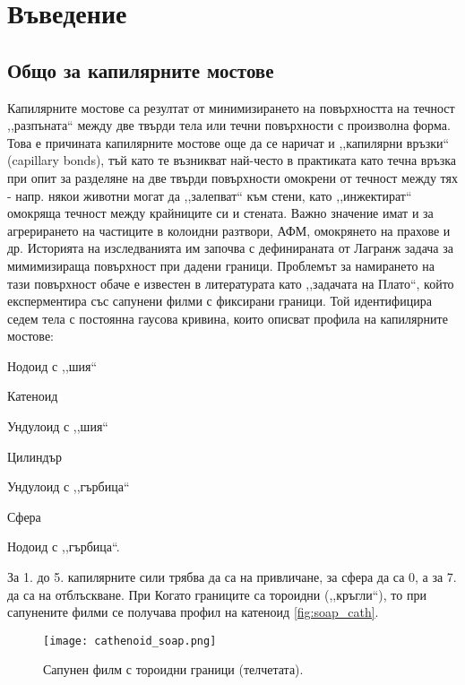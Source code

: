 \section{Въведение}
\subsection{Общо за капилярните мостове}
Капилярните мостове са резултат от минимизирането на повърхността на течност
,,разпъната`` между две твърди тела или течни повърхности с произволна форма.
Това е причината капилярните мостове още да се наричат и ,,капилярни връзки`` (capillary bonds),
тъй като те възникват най-често в практиката като течна връзка при опит за разделяне на две
твърди повърхности омокрени от течност между тях - напр. някои животни могат да ,,залепват`` към
стени, като ,,инжектират`` омокряща течност между \cite{Persson_2007} крайниците си и стената.
Важно значение имат и за агрерирането на частиците в колоидни разтвори, АФМ, омокрянето на прахове и др.
Историята на изследванията им започва с дефинираната от Лагранж задача за мимимизираща повърхност
при дадени граници. Проблемът за намирането на тази повърхност обаче е известен в литературата
като ,,задачата на Плато``, който експерментира със сапунени филми с фиксирани граници.
Той идентифицира седем тела с постоянна гаусова кривина, които описват профила на капилярните мостове:
\begin{enumerate*}
	\item Нодоид с ,,шия``
	\item Катеноид
	\item Ундулоид с ,,шия``
	\item Цилиндър
	\item Ундулоид с ,,гърбица``
	\item Сфера
	\item Нодоид с ,,гърбица``.
\end{enumerate*}
За 1. до 5. капилярните сили трябва да са на привличане, за сфера да са 0, а за 7. да са на
отблъскване. При \cite{Kralchevsky}
Когато границите са тороидни (,,кръгли``), то при сапунените филми се получава профил на катеноид \autoref{fig:soap_cath}.
\begin{figure}[h]
	\centering
	\texttt{[image: cathenoid\_soap.png]}
	\caption{Сапунен филм с тороидни граници (телчетата).\cite{Soap_cathenoid}}
	\label{fig:soap_cath}
\end{figure}
